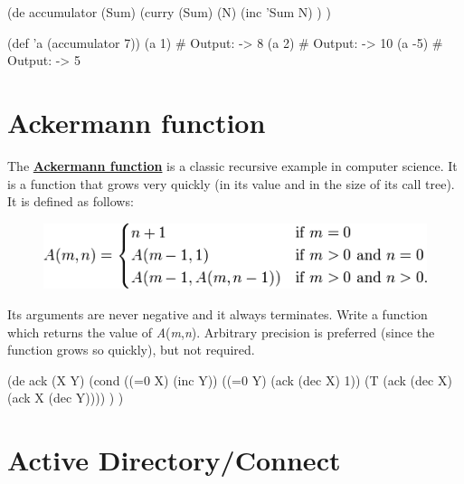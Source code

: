 \begin{wideverbatim}

(de accumulator (Sum)
   (curry (Sum) (N)
      (inc 'Sum N) ) )

(def 'a (accumulator 7))
(a 1)  # Output: -> 8
(a 2)  # Output: -> 10
(a -5)  # Output: -> 5

\end{wideverbatim}

\pagebreak{}
\section*{Ackermann function}

The
\textbf{\href{http://en.wikipedia.org/wiki/Ackermann\_function}{Ackermann
function}} is a classic recursive example in computer science. It is a
function that grows very quickly (in its value and in the size of its
call tree). It is defined as follows:

\begin{figure}[htbp]
\centering
\includegraphics[scale=.6]{graphics/0ae4053de098cc9554752b190a38bc56.png}
\end{figure}

Its arguments are never negative and it always terminates. Write a
function which returns the value of \emph{A}(\emph{m},\emph{n}).
Arbitrary precision is preferred (since the function grows so quickly),
but not required.

\begin{wideverbatim}

(de ack (X Y)
   (cond
      ((=0 X) (inc Y))
      ((=0 Y) (ack (dec X) 1))
      (T (ack (dec X) (ack X (dec Y)))) ) )

\end{wideverbatim}

\pagebreak{}
\section*{Active Directory/Connect}


